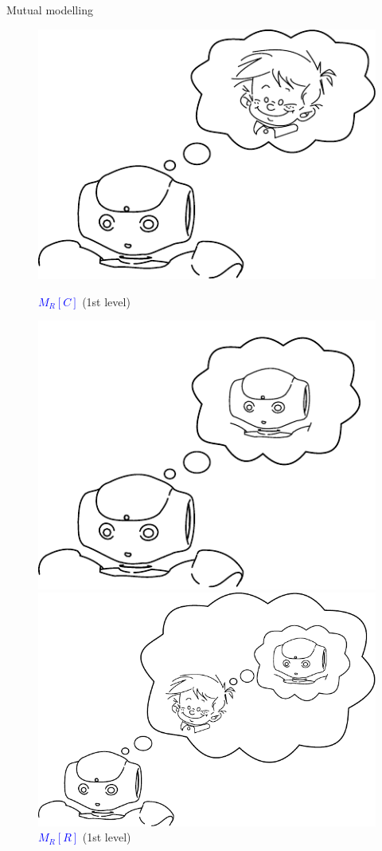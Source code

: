 \documentclass[compress]{beamer}
\begin{document}
\begin{frame}{Mutual modelling}
\begin{figure}[!tbp]
	\begin{minipage}[b]{.4\textwidth}
		\includegraphics[width=0.8\columnwidth]{naoMM}
		\caption{\textcolor{blue}{$M_R\left[\textit{C}\right]$} (1st level) }
	\end{minipage}
	\hfill
	\begin{minipage}[b]{.4\textwidth}
		\includegraphics[width=0.8\columnwidth]{naoMM4}
		\caption{\textcolor{blue}{$M_R\left[\textit{R}\right]$} (1st level)}
	\end{minipage}
	\hfill
	\begin{minipage}[b]{.4\textwidth}
		\includegraphics[width=0.8\columnwidth]{naoMM2}

\end{minipage}
\end{figure}
\end{frame}
\end{document}
